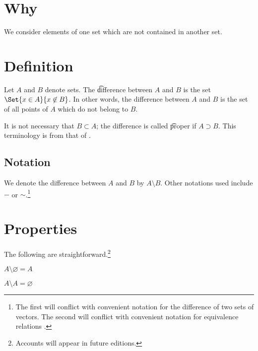 
\section*{Why}

We consider elements of one set which are not contained in another set.

\section*{Definition}

Let $A$ and $B$ denote sets.
The \t{difference} between $A$ and $B$ is the set $\Set{x \in A}{x \not\in B}$.
In other words, the difference between $A$ and $B$ is the set of all points of $A$ which do not belong to $B$.

It is not necessary that $B \subset A$; the difference is called \t{proper} if $A \supset B$.
This terminology is from that of .

\subsection*{Notation}

We denote the difference between $A$ and $B$ by $A \setminus B$.
Other notations used include $-$ or $\sim$.\footnote{The first will conflict with convenient notation for the difference of two sets of vectors.
The second will conflict with convenient notation for equivalence relations .}





\section*{Properties}

The following are straightforward.\footnote{Accounts will appear in future editions.}

\begin{proposition}
$A \setminus \varnothing = A$
\end{proposition}

\begin{proposition}
$A \setminus A = \varnothing$
\end{proposition}

\blankpage
